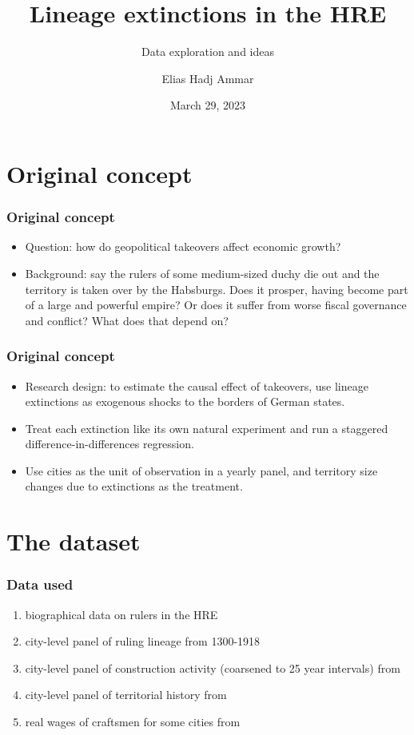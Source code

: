 \documentclass{beamer}
\title{Lineage extinctions in the HRE} %
\subtitle{Data exploration and ideas}
\author{Elias Hadj Ammar} %
\institute[LMU,Munich] %
{
LMU, Munich %

}
\date{March 29, 2023} %
\begin{document}
\begin{frame}
\titlepage %
\end{frame}

\section{Original concept}
\begin{frame}
\frametitle{Original concept}
    \begin{itemize}
        \item Question: how do geopolitical takeovers affect economic growth?
        \item Background: say the rulers of some medium-sized duchy die out and the territory is taken over by the Habsburgs. Does it prosper, having become part of a large and powerful empire? Or does it suffer from worse fiscal governance and conflict? What does that depend on?
    \end{itemize}
\end{frame}

\begin{frame}
\frametitle{Original concept}
\begin{itemize}
    \item Research design: to estimate the causal effect of takeovers, use lineage extinctions as exogenous shocks to the borders of German states.
    \item Treat each extinction like its own natural experiment and run a staggered difference-in-differences regression.
    \item Use cities as the unit of observation in a yearly panel, and territory size changes due to extinctions as the treatment.
\end{itemize}
\end{frame}

\section{The dataset}
\begin{frame}
\frametitle{Data used}
\begin{enumerate}
    \item biographical data on rulers in the HRE
    \item city-level panel of ruling lineage from 1300-1918
    \item city-level panel of construction activity (coarsened to 25 year intervals) from \cite{construction2020}
    \item city-level panel of territorial history from \cite{territories2020}
    \item real wages of craftsmen for some cities from \cite{allen2001}
\end{enumerate}
    
\end{frame}
\end{document}
